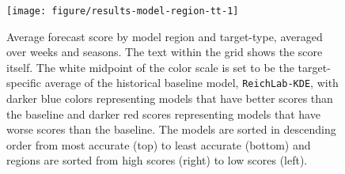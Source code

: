 \documentclass{article}\usepackage[]{graphicx}\usepackage[]{color}
\newenvironment{knitrout}{}{} %
\begin{document}
\begin{knitrout}
\color{fgcolor}\begin{figure}
\texttt{[image: figure/results-model-region-tt-1]} \caption[Average forecast score by model region and target-type, averaged over weeks and seasons]{Average forecast score by model region and target-type, averaged over weeks and seasons. The text within the grid shows the score itself. The white midpoint of the color scale is set to be the target-specific average of the historical baseline model, {\tt ReichLab-KDE}, with darker blue colors representing models that have better scores than the baseline and darker red scores representing models that have worse scores than the baseline. The models are sorted in descending order from most accurate (top) to least accurate (bottom) and regions are sorted from high scores (right) to low scores (left).}\label{fig:results-model-region-tt}
\end{figure}


\end{knitrout}






\end{document}

